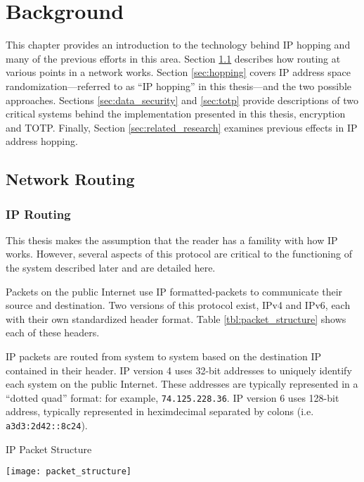 \chapter{Background}
\label{chp:background}
\par This chapter provides an introduction to the technology behind \ac{IP} hopping and many of the previous efforts in this area. Section \ref{sec:routing} describes how routing at various points in a network works. Section \ref{sec:hopping} covers IP address space randomization---referred to as ``\ac{IP} hopping'' in this thesis---and the two possible approaches. Sections \ref{sec:data_security} and \ref{sec:totp} provide descriptions of two critical systems behind the implementation presented in this thesis, encryption and \ac{TOTP}. Finally, Section \ref{sec:related_research} examines previous effects in \ac{IP} address hopping.

\section{Network Routing}
\label{sec:routing}

\subsection{\ac{IP} Routing}
\label{sec:ip_routing}
\par This thesis makes the assumption that the reader has a famility with how \ac{IP} works. However, several aspects of this protocol are critical to the functioning of the system described later and are detailed here. 

\par Packets on the public Internet use \ac{IP} formatted-packets to communicate their source and destination. Two versions of this protocol exist, \ac{IPv4} and \ac{IPv6}, each with their own standardized header format. Table \ref{tbl:packet_structure} shows each of these headers.

\par \ac{IP} packets are routed from system to system based on the destination \ac{IP} contained in their header. IP version 4 uses 32-bit addresses to uniquely identify each system on the public Internet. These addresses are typically represented in a ``dotted quad'' format: for example, \texttt{74.125.228.36}. IP version 6 uses 128-bit address, typically represented in heximdecimal separated by colons (i.e. \texttt{a3d3:2d42::8c24}).

\begin{landscape}
\begin{table}
\caption{\ac{IP} Packet Structure}
\label{tbl:packet_structure}
\centering
\texttt{[image: packet\_structure]}
\end{table}
\end{landscape}


